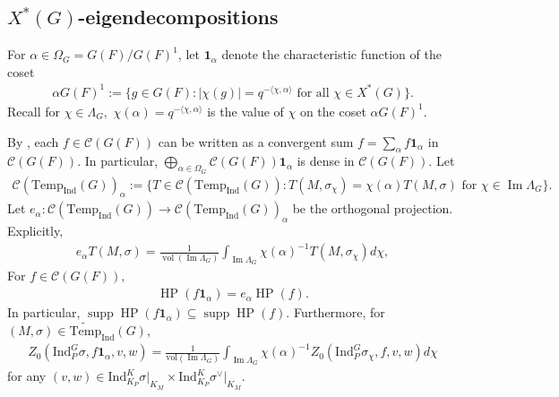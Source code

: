 \documentclass[10pt]{amsart}
\theoremstyle{definition}
\numberwithin{equation}{section}
\DeclareMathOperator{\vol}{\mathrm{vol}}
\DeclareMathOperator{\supp}{\mathrm{supp}}
\numberwithin{equation}{subsection}
\newcommand{\Ind}{\mathrm{Ind}}
\newcommand{\Temp}{\mathrm{Temp}}
\renewcommand{\Im}{\mathop{\mathrm{Im}}}
\newcommand{\HP}{\mathop{\mathrm{HP}}\nolimits}
\begin{document}
\subsection{$X^*(G)$-eigendecompositions} 

For $\alpha\in \Omega_G= G(F)/G(F)^1$, let $\mathbf{1}_\alpha$ denote the characteristic function of the coset
\begin{align*}
     \alpha G(F)^1 := \big\{g\in G(F): |\chi(g)| = q^{-\langle\chi,\alpha\rangle}\text{ for all }\chi\in X^*(G)\big\}.
\end{align*}
Recall for $\chi\in \Lambda_G,$ $\chi(\alpha)=q^{-\langle\chi,\alpha\rangle}$ is the value of $\chi$ on the coset $\alpha G(F)^1$.


By \cite[Lemma 6.8]{DRS}, each $f\in \mathcal{C}(G(F))$ can be written as a convergent sum $f=\sum_\alpha f\mathbf{1}_\alpha$ in $\mathcal{C}(G(F))$. In particular, $\bigoplus\limits_{\alpha\in\Omega_G}\mathcal{C}(G(F))\mathbf{1}_\alpha$ is dense in $\mathcal{C}(G(F))$. Let 
\begin{align*}
    \mathcal{C}(\Temp_\Ind(G))_\alpha:=\{T\in \mathcal{C}(\Temp_\Ind(G)): T(M,\sigma_\chi) = \chi(\alpha) T(M,\sigma) \text{ for }\chi\in \Im\Lambda_G\}.
\end{align*}
Let
$e_\alpha:\mathcal{C}(\Temp_\Ind(G))\to \mathcal{C}(\Temp_\Ind(G))_\alpha$ be the orthogonal projection. Explicitly, 
\begin{align}\label{ealpha:orthproj}
    e_\alpha T(M,\sigma) = \frac{1}{\vol(\Im \Lambda_G)}\int_{\Im \Lambda_G} \chi(\alpha)^{-1}T(M,\sigma_\chi)d\chi,
\end{align}
For $f\in \mathcal{C}(G(F)),$
\begin{align}\label{HP:orthoproj:alpha}
    \HP(f\mathbf{1}_\alpha) = e_\alpha\HP(f).
\end{align}
In particular, $\supp\HP(f\mathbf{1}_\alpha)\subseteq \supp\HP(f)$. Furthermore, for $(M,\sigma)\in\widetilde{\Temp}_\Ind(G)$,
    \begin{align}\label{eq:restricts:coset}
        Z_0(\Ind_P^G\sigma,f\mathbf{1}_\alpha,v,w) = \frac{1}{\mathrm{vol}(\Im \Lambda_G)}\int_{\Im \Lambda_G} \chi(\alpha)^{-1} Z_0(\Ind_P^G \sigma_\chi,f,v,w)d\chi
    \end{align}
for any $(v,w)\in\Ind_{K_P}^K\sigma\vert_{K_M}\times\Ind_{K_P}^K\sigma^\vee\vert_{K_M}.$
\end{document}
